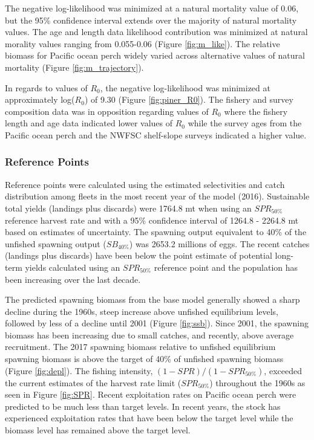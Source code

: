 \documentclass[12pt,]{article}
\begin{document}
The negative log-likelihood was minimized at a natural mortality value
of 0.06, but the 95\% confidence interval extends over the majority of
natural mortality values. The age and length data likelihood
contribution was minimized at natural morality values ranging from
0.055-0.06 (Figure \ref{fig:m_like}). The relative biomass for Pacific
ocean perch widely varied across alternative values of natural mortality
(Figure \ref{fig:m_trajectory}).

In regards to values of \(R_0\), the negative log-likelihood was
minimized at approximately log(\(R_0\)) of 9.30 (Figure
\ref{fig:piner_R0}). The fishery and survey composition data was in
opposition regarding values of \(R_0\) where the fishery length and age
data indicated lower values of \(R_0\) while the survey ages from the
Pacific ocean perch and the NWFSC shelf-slope surveys indicated a higher
value.

\subsubsection{Reference Points}\label{reference-points-1}

Reference points were calculated using the estimated selectivities and
catch distribution among fleets in the most recent year of the model
(2016). Sustainable total yields (landings plus discards) were 1764.8 mt
when using an \(SPR_{50\%}\) reference harvest rate and with a 95\%
confidence interval of 1264.8 - 2264.8 mt based on estimates of
uncertainty. The spawning output equivalent to 40\% of the unfished
spawning output (\(SB_{40\%}\)) was 2653.2 millions of eggs. The recent
catches (landings plus discards) have been below the point estimate of
potential long-term yields calculated using an \(SPR_{50\%}\) reference
point and the population has been increasing over the last decade.

The predicted spawning biomass from the base model generally showed a
sharp decline during the 1960s, steep increase above unfished
equilibrium levels, followed by less of a decline until 2001 (Figure
\ref{fig:ssb}). Since 2001, the spawning biomass has been increasing due
to small catches, and recently, above average recruitment. The 2017
spawning biomass relative to unfished equilibrium spawning biomass is
above the target of 40\% of unfished spawning biomass (Figure
\ref{fig:depl}). The fishing intensity, \((1-SPR)/(1-SPR_{50\%})\),
exceeded the current estimates of the harvest rate limit
(\(SPR_{50\%}\)) throughout the 1960s as seen in Figure \ref{fig:SPR}.
Recent exploitation rates on Pacific ocean perch were predicted to be
much less than target levels. In recent years, the stock has experienced
exploitation rates that have been below the target level while the
biomass level has remained above the target level.
\end{document}
